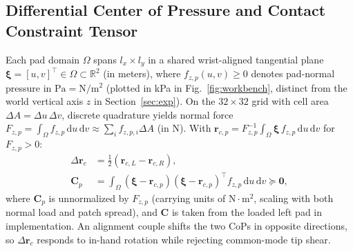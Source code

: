 \documentclass[letterpaper,10pt,conference]{IEEEtran}
\begin{document}
\subsection{Differential Center of Pressure and Contact Constraint Tensor}
Each pad domain $\Omega$ spans $l_x\times l_y$ in a shared wrist-aligned tangential plane $\boldsymbol\xi=[u,v]^\top\in\Omega\subset\mathbb{R}^2$ (in meters), where $f_{z,p}(u,v)\ge 0$ denotes pad-normal pressure in $\mathrm{Pa}=\mathrm{N/m^2}$ (plotted in kPa in Fig.~\ref{fig:workbench}, distinct from the world vertical axis $z$ in Section~\ref{sec:exp}). On the $32\times32$ grid with cell area $\Delta A=\Delta u\,\Delta v$, discrete quadrature yields normal force $F_{z,p}=\int_\Omega f_{z,p}\,\mathrm{d}u\,\mathrm{d}v\approx\sum_i f_{z,p,i}\Delta A$ (in N). With $\mathbf{r}_{c,p}=F_{z,p}^{-1}\int_\Omega \boldsymbol\xi\,f_{z,p}\,\mathrm{d}u\,\mathrm{d}v$ for $F_{z,p}>0$:
\begin{equation}
\begin{aligned}
\Delta\mathbf{r}_c&=\tfrac12(\mathbf{r}_{c,L}-\mathbf{r}_{c,R}),\\
\mathbf{C}_p&=\int_\Omega(\boldsymbol\xi-\mathbf{r}_{c,p})(\boldsymbol\xi-\mathbf{r}_{c,p})^\top
 f_{z,p}\,\mathrm{d}u\,\mathrm{d}v\succeq\mathbf{0},
\end{aligned}
\label{eq:invariants}
\end{equation}
where $\mathbf{C}_p$ is unnormalized by $F_{z,p}$ (carrying units of $\mathrm{N\cdot m^2}$, scaling with both normal load and patch spread), and $\mathbf{C}$ is taken from the loaded left pad in implementation. An alignment couple shifts the two CoPs in opposite directions, so $\Delta\mathbf{r}_c$ responds to in-hand rotation while rejecting common-mode tip shear.
\end{document}
